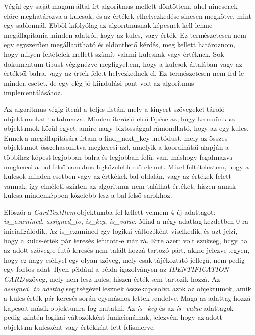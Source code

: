 \documentclass[12pt]{report}
\begin{document}
Végül egy saját magam által írt algoritmus mellett döntöttem, ahol nincsenek előre meghatározva a kulcsok, és az értékek elhelyezkedése sincsen megkötve, mint egy sablonnál. Ebből kifolyólag az algoritmusnak képesnek kell lennie megállapítania minden adatról, hogy az kulcs, vagy érték. Ez természetesen nem egy egyszerűen megállapítható és eldönthető kérdés, meg kellett határoznom, hogy milyen feltételek mellett számít valami kulcsnak vagy értéknek. Sok dokumentum típust végignézve megfigyeltem, hogy a kulcsok általában vagy az értéktől balra, vagy az érték felett helyezkednek el. Ez természetesen nem fed le minden esetet, de egy elég jó kiindulási pont volt az algoritmus implementálásához. 

Az algoritmus végig iterál a teljes listán, mely a kinyert szövegeket tároló objektumokat tartalmazza. Minden iteráció első lépése az, hogy keressünk az objektumok közül egyet, amire nagy biztossággal rámondható, hogy az egy kulcs. Ennek a megállapítására írtam a find\_next\_key metódust, mely az összes objektumot összehasonlítva megkeresi azt, amelyik a koordinátái alapján a többihez képest legjobban balra és legjobban felül van, máshogy fogalmazva megkeresi a bal felső sarokhoz legközelebb eső elemet. Mivel feltételeztem, hogy a kulcsok minden esetben vagy az értkékek bal oldalán, vagy az értékek felett vannak, így elméleti szinten az algoritmus nem találhat értéket, hiszen annak kulcsa mindenképpen közelebb lesz a bal felső sarokhoz.

Először a \emph{CardTextItem} objektumba fel kellett vennem 4 új adattagot: \emph{is\_examined}, \emph{assigned\_to}, \emph{is\_key}, \emph{is\_value}. Mind a négy adattag kezdetben 0-ra inicializálódik. Az is\_examined egy logikai változóként viselkedik, és azt jelzi, hogy a kulcs-érték pár keresés lefutott-e már rá. Erre azért volt szükség, hogy ha az adott szövegre futó keresés nem talált hozzá tartozó párt, akkor jelezve legyen, hogy ez nagy eséllyel egy olyan szöveg, mely csak tájékoztató jellegű, nem pedig egy fontos adat. Ilyen például a példa igazolványon az \emph{IDENTIFICATION CARD} szöveg, mely nem lesz kulcs, hiszen érték sem tartozik hozzá.
Az \emph{assigned\_to adattag} segítségével lesznek összekapcsolva azok az objektumok, amik a kulcs-érték pár keresés során egymáshoz lettek rendelve. Maga az adattag hozzá kapcsolt másik objektumra fog mutatni. Az \emph{is\_key} és az \emph{is\_value} adattagok pedig szintén logikai változókként funkcionálnak, jelezvén, hogy az adott objektum kulcsként vagy értékként lett felismerve.
\end{document}
